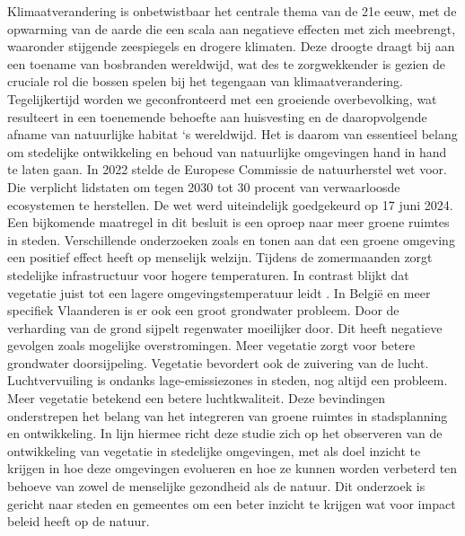 
Klimaatverandering is onbetwistbaar het centrale thema van de 21e eeuw, met de opwarming van de aarde die een scala aan negatieve 
effecten met zich meebrengt, waaronder stijgende zeespiegels en drogere klimaten. Deze droogte draagt bij aan een toename van 
bosbranden wereldwijd, wat des te zorgwekkender is gezien de cruciale rol die bossen spelen bij het tegengaan van klimaatverandering. 
Tegelijkertijd worden we geconfronteerd met een groeiende overbevolking, wat resulteert in een toenemende behoefte aan huisvesting 
en de daaropvolgende afname van natuurlijke habitat ‘s wereldwijd. Het is daarom van essentieel belang om stedelijke ontwikkeling en behoud 
van natuurlijke omgevingen hand in hand te laten gaan.
\newline
\newline
In 2022 stelde de Europese Commissie de natuurherstel wet voor. Die verplicht lidstaten om tegen 2030 tot 30 procent van 
verwaarloosde ecosystemen te herstellen. De wet werd uiteindelijk goedgekeurd op 17 juni 2024. Een bijkomende maatregel in dit besluit is een
oproep naar meer groene ruimtes in steden.
Verschillende onderzoeken zoals \textcite{bajirao2015importance} en \textcite{Birch_2020} tonen aan dat een groene omgeving een positief effect heeft op 
menselijk welzijn. Tijdens de zomermaanden zorgt stedelijke infrastructuur voor 
hogere temperaturen. In contrast blijkt dat vegetatie juist tot een lagere omgevingstemperatuur leidt \autocite{vuckovic2017studies}.
In België en meer specifiek Vlaanderen is er ook een groot grondwater probleem. Door de verharding van de grond sijpelt regenwater moeilijker door. 
Dit heeft negatieve gevolgen zoals mogelijke overstromingen. Meer vegetatie zorgt voor betere grondwater doorsijpeling. 
Vegetatie bevordert ook de zuivering van de lucht. Luchtvervuiling is ondanks lage-emissiezones in steden, nog altijd een probleem.
Meer vegetatie betekend een betere luchtkwaliteit.
\newline
\newline
Deze bevindingen onderstrepen het belang van het integreren van groene ruimtes in stadsplanning en ontwikkeling. 
In lijn hiermee richt deze studie zich op het observeren van de ontwikkeling van vegetatie in stedelijke omgevingen, met als doel inzicht 
te krijgen in hoe deze omgevingen evolueren en hoe ze kunnen worden verbeterd ten behoeve van zowel de menselijke gezondheid als de natuur.
Dit onderzoek is gericht naar steden en gemeentes om een beter inzicht te krijgen wat voor impact beleid heeft op de natuur.
\newline
\newline

